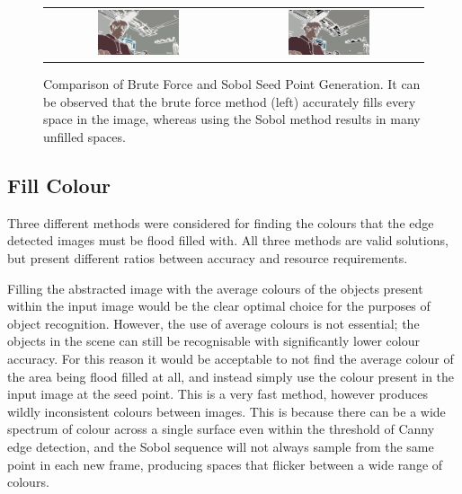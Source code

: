 \begin{figure}[H]
    \begin{center}
    \begin{tabular}{ c c }
        \includegraphics[width=0.45\textwidth]{Figures/Brute.jpg} &
        \includegraphics[width=0.45\textwidth]{Figures/Sobol.jpg}
    \end{tabular}
    \caption[Comparison of Brute Force and Sobol Seed Point Generation]{Comparison of Brute Force and Sobol Seed Point Generation. It can be observed that the brute force method (left) accurately fills every space in the image, whereas using the Sobol method results in many unfilled spaces.}
    \label{fig:BrutevsSobol}
    \end{center}
\end{figure}

\subsection{Fill Colour}

Three different methods were considered for finding the colours that the edge detected images must be flood filled with. All three methods are valid solutions, but present different ratios between accuracy and resource requirements.

Filling the abstracted image with the average colours of the objects present within the input image would be the clear optimal choice for the purposes of object recognition. However, the use of average colours is not essential; the objects in the scene can still be recognisable with significantly lower colour accuracy. For this reason it would be acceptable to not find the average colour of the area being flood filled at all, and instead simply use the colour present in the input image at the seed point. This is a very fast method, however produces wildly inconsistent colours between images. This is because there can be a wide spectrum of colour across a single surface even within the threshold of Canny edge detection, and the Sobol sequence will not always sample from the same point in each new frame, producing spaces that flicker between a wide range of colours.

